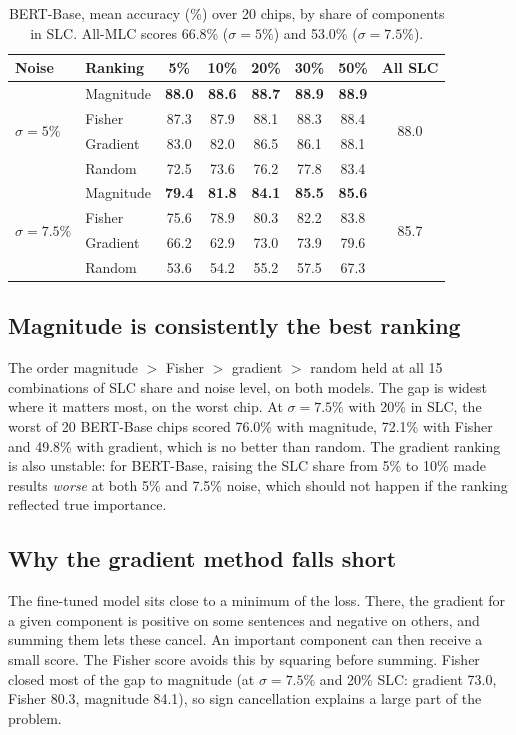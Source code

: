 \documentclass[10pt,a4paper]{article}
\newcommand{\best}[1]{\textcolor{cmag}{\textbf{#1}}}
\begin{document}
\begin{table}[h]
\centering\small
\begin{tabular}{@{}llcccccc@{}}
\toprule
Noise & Ranking & 5\% & 10\% & 20\% & 30\% & 50\% & All SLC \\
\midrule
\multirow{4}{*}{$\sigma=5\%$}
 & Magnitude & \best{88.0} & \best{88.6} & \best{88.7} & \best{88.9} & \best{88.9} & \multirow{4}{*}{88.0} \\
 & Fisher    & 87.3 & 87.9 & 88.1 & 88.3 & 88.4 & \\
 & Gradient  & 83.0 & 82.0 & 86.5 & 86.1 & 88.1 & \\
 & Random    & 72.5 & 73.6 & 76.2 & 77.8 & 83.4 & \\
\midrule
\multirow{4}{*}{$\sigma=7.5\%$}
 & Magnitude & \best{79.4} & \best{81.8} & \best{84.1} & \best{85.5} & \best{85.6} & \multirow{4}{*}{85.7} \\
 & Fisher    & 75.6 & 78.9 & 80.3 & 82.2 & 83.8 & \\
 & Gradient  & 66.2 & 62.9 & 73.0 & 73.9 & 79.6 & \\
 & Random    & 53.6 & 54.2 & 55.2 & 57.5 & 67.3 & \\
\bottomrule
\end{tabular}
\caption{BERT-Base, mean accuracy (\%) over 20 chips, by share of components in SLC. All-MLC scores 66.8\%
($\sigma=5\%$) and 53.0\% ($\sigma=7.5\%$).}
\end{table}

\subsection{Magnitude is consistently the best ranking}
The order magnitude $>$ Fisher $>$ gradient $>$ random held at all 15 combinations of SLC share and
noise level, on both models. The gap is widest where it matters most, on the worst chip. At
$\sigma=7.5\%$ with 20\% in SLC, the worst of 20 BERT-Base chips scored 76.0\% with magnitude, 72.1\% with
Fisher and 49.8\% with gradient, which is no better than random. The gradient ranking is also unstable:
for BERT-Base, raising the SLC share from 5\% to 10\% made results \emph{worse} at both 5\% and 7.5\%
noise, which should not happen if the ranking reflected true importance.

\subsection{Why the gradient method falls short}
The fine-tuned model sits close to a minimum of the loss. There, the gradient for a given component is
positive on some sentences and negative on others, and summing them lets these cancel. An important
component can then receive a small score. The Fisher score avoids this by squaring before summing. Fisher
closed most of the gap to magnitude (at $\sigma=7.5\%$ and 20\% SLC: gradient 73.0, Fisher 80.3,
magnitude 84.1), so sign cancellation explains a large part of the problem.
\end{document}
